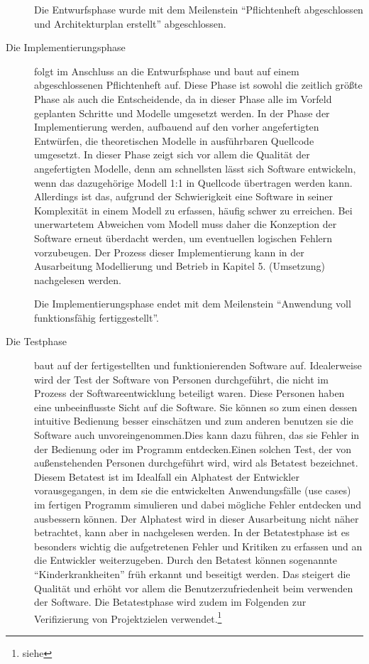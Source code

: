 \begin{description}
  Die Entwurfsphase wurde mit dem Meilenstein "`Pflichtenheft abgeschlossen und
  Architekturplan erstellt"' abgeschlossen.

  \item[Die Implementierungsphase] folgt im Anschluss an die Entwurfsphase und
  baut auf einem abgeschlossenen Pflichtenheft auf. Diese Phase ist sowohl die
  zeitlich größte Phase als auch die Entscheidende, da in dieser Phase alle im
  Vorfeld geplanten Schritte und Modelle umgesetzt werden. In der Phase der
  Implementierung werden, aufbauend auf den vorher angefertigten Entwürfen, die
  theoretischen Modelle in ausführbaren Quellcode umgesetzt. In dieser Phase
  zeigt sich vor allem die Qualität der angefertigten Modelle, denn am
  schnellsten lässt sich Software entwickeln, wenn das dazugehörige Modell
  1:1 in Quellcode übertragen werden kann. Allerdings ist das, aufgrund der
  Schwierigkeit eine Software in seiner Komplexität in einem Modell zu erfassen,
  häufig schwer zu erreichen. Bei unerwartetem Abweichen vom Modell muss daher
  die Konzeption der Software erneut überdacht werden, um eventuellen logischen
  Fehlern vorzubeugen. Der Prozess dieser Implementierung kann in der
  Ausarbeitung Modellierung und Betrieb in Kapitel 5. (Umsetzung) nachgelesen werden.

  Die Implementierungsphase endet mit dem Meilenstein "`Anwendung voll
  funktionsfähig fertiggestellt"'.

  \item[Die Testphase] baut auf der fertigestellten und funktionierenden Software auf.
  Idealerweise wird der Test der Software von Personen durchgeführt, die nicht im Prozess der
  Softwareentwicklung beteiligt waren. Diese Personen haben eine
  unbeeinflusste Sicht auf die Software. Sie können so zum einen dessen
  intuitive Bedienung besser einschätzen und zum anderen benutzen sie die Software auch
  unvoreingenommen.Dies kann dazu führen, das sie Fehler in der Bedienung oder
  im Programm entdecken.Einen solchen Test, der von außenstehenden Personen
  durchgeführt wird, wird als Betatest bezeichnet. Diesem Betatest ist im
  Idealfall ein Alphatest der Entwickler vorausgegangen, in dem sie die entwickelten Anwendungsfälle (use cases) im fertigen Programm simulieren und dabei mögliche
  Fehler entdecken und ausbessern können. Der Alphatest wird in dieser Ausarbeitung nicht näher betrachtet,
  kann aber in \citet{modelierungUndBetrieb2014} nachgelesen werden.
  In der Betatestphase ist es besonders wichtig die  aufgetretenen Fehler
  und Kritiken zu erfassen und an die Entwickler weiterzugeben. Durch den
  Betatest können sogenannte "`Kinderkrankheiten"' früh erkannt und beseitigt
  werden. Das steigert die Qualität und erhöht vor allem die
  Benutzerzufriedenheit beim verwenden der Software. Die Betatestphase wird zudem im Folgenden
  zur Verifizierung von Projektzielen verwendet.\footnote{siehe }


\end{description}

